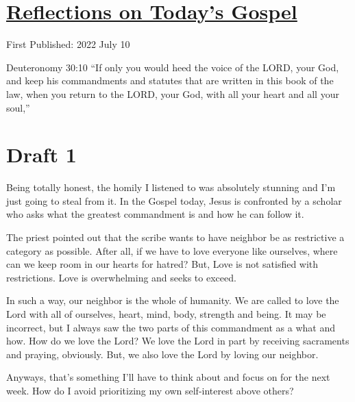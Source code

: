 \documentclass[12pt]{article}[titlepage]
\newcommand{\say}[1]{``#1''}
\newcommand{\1}{\={a}}
\newcommand{\2}{\={e}}
\newcommand{\3}{\={\i}}
\newcommand{\4}{\=o}
\newcommand{\5}{\=u}
\newcommand{\6}{\={A}}
\renewcommand{\,}{\textsuperscript{,}}
\begin{document}
\doublespacing
\section{\href{reflections-on-readings-15-ordinary-c-22.html}{Reflections on Today's Gospel}}
First Published: 2022 July 10

Deuteronomy 30:10 \say{If only you would heed the voice of the LORD, your God,
and keep his commandments and statutes
that are written in this book of the law,
when you return to the LORD, your God,
with all your heart and all your soul,}

\section{Draft 1}
Being totally honest, the homily I listened to was absolutely stunning and I'm just going to steal from it.
In the Gospel today, Jesus is confronted by a scholar who asks what the greatest commandment is and how he can follow it.

The priest pointed out that the scribe wants to have neighbor be as restrictive a category as possible.
After all, if we have to love everyone like ourselves, where can we keep room in our hearts for hatred?
But, Love is not satisfied with restrictions.
Love is overwhelming and seeks to exceed.

In such a way, our neighbor is the whole of humanity.
We are called to love the Lord with all of ourselves, heart, mind, body, strength and being.
It may be incorrect, but I always saw the two parts of this commandment as a what and how.
How do we love the Lord?
We love the Lord in part by receiving sacraments and praying, obviously.
But, we also love the Lord by loving our neighbor.

Anyways, that's something I'll have to think about and focus on for the next week.
How do I avoid prioritizing my own self-interest above others?
\end{document}

